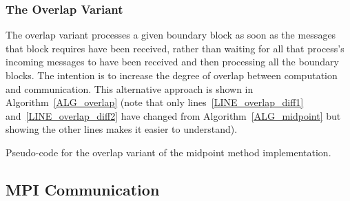 \documentclass[paper=a4, fontsize=11pt,bibtotoc]{scrartcl}		%
\begin{document}
\subsubsection{The Overlap Variant}\label{SEC_overlap}

The overlap variant processes a given boundary block as soon as the messages that block requires have been received, rather than waiting for all 
that process's incoming messages to have been received and then processing all the boundary blocks. The intention is to increase the degree of 
overlap between computation and communication. This alternative approach is shown in Algorithm~\ref{ALG_overlap} (note that only 
lines~\ref{LINE_overlap_diff1} and~\ref{LINE_overlap_diff2} have changed from Algorithm~\ref{ALG_midpoint} but showing the other lines makes it 
easier to understand).
\begin{algorithm}[tbp]
	\begin{algorithmic}[1]
\setcounter{ALC@line}{3}
		\label{LINE_overlap_mainloopstart}
			\label{LINE_overlap_diff1}
				\label{LINE_overlap_diff2}
					\ENDFOR
				\ENDFOR
			\ENDIF
			\ENDFOR
		\ENDFOR \label{LINE_overlap_mainloopend}
	\end{algorithmic}
	\caption{Pseudo-code for the overlap variant of the midpoint method implementation.}
	\label{ALG_overlap}
\end{algorithm}


\subsection{MPI Communication}\label{SEC_MPI}
\end{document}
